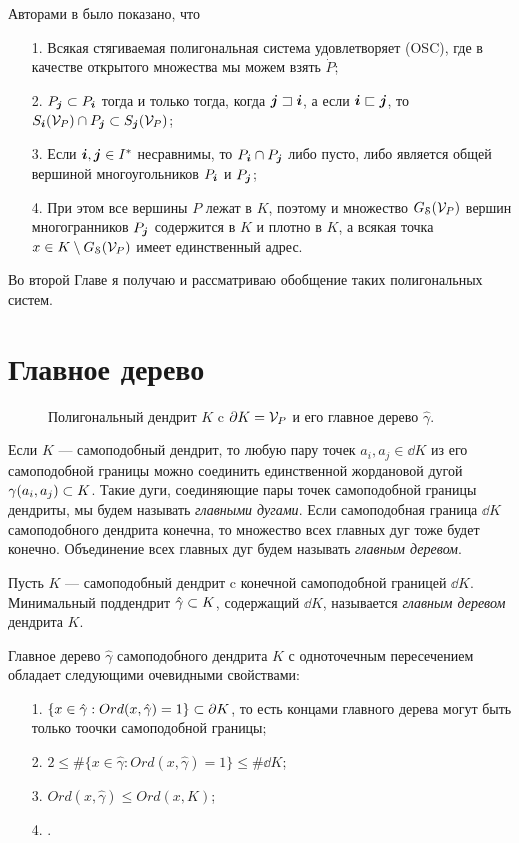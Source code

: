 Авторами в \cite[Theorem 4]{TSV2017} было показано, что
\begin{enumerate}[nolistsep]
\item[1.] Всякая стягиваемая полигональная система удовлетворяет (OSC), где  в качестве открытого множества мы можем взять $\dot P$;
\item[2.] $P_{\bm{j}}\subset P_{\bm{i}}$ тогда и только тогда, когда  ${\bm{j}}\sqsupset{\bm{i}}$, а если ${\bm{i}}\sqsubset{\bm{j}}$, то  $ S_{\bm{i}}({\mathcal V}_P)\cap P_{\bm{j}}\subset S_{\bm{j}}({\mathcal V}_P)$;
\item[3.] Если ${\bm{i}},{\bm{j}}\in I^*$ несравнимы, то $P_{\bm{i}}\cap P_{\bm{j}}$ либо пусто, либо является  общей вершиной многоугольников $P_{\bm{i}}$ и  $P_{\bm{j}}$;
\item[4.] При этом все вершины $P$ лежат в $K$, поэтому и множество $G_{\EuScript S}({\mathcal V}_P)$ вершин многогранников $P_{\bm{j}}$ содержится в $K$ и плотно в $K$, а всякая точка $x\in K\setminus G_{\EuScript S}({\mathcal V}_P)$ имеет единственный адрес.
\end{enumerate}
 
Во второй Главе я получаю и рассматриваю обобщение таких полигональных систем.



\section{Главное дерево}

\begin{figure}[H]
\caption{Полигональный дендрит $K$ c $\partial K={\mathcal V}_P$ и его главное дерево $\hat\gamma$. }
\label{fig:penta4plus3}
\end{figure}

Если $K$ --- самоподобный дендрит, то любую пару точек $a_i,a_j\in\dd K$ из его самоподобной границы можно соединить единственной жордановой дугой $\gamma(a_i,a_j)\subset K$.
Такие дуги, соединяющие пары точек самоподобной границы дендриты, мы будем называть {\em главными дугами}.
Если самоподобная граница $\dd K$ самоподобного дендрита конечна, то множество всех главных дуг тоже будет конечно.
Объединение всех главных дуг будем называть {\em главным деревом}.

\begin{definition}\label{dfn:MT}
Пусть $K$ --- самоподобный дендрит c конечной самоподобной границей $\dd K$. 
Минимальный поддендрит $\hat\gamma\subset K$, содержащий $\dd K$, называется {\em главным деревом} дендрита $K$.
\end{definition}

Главное дерево $\hat\gamma$ самоподобного дендрита $K$ с одноточечным пересечением обладает следующими очевидными свойствами:
\begin{enumerate}[nolistsep]
\item[1.] $\{x\in\hat\gamma:Ord(x,\hat\gamma)=1\}\subset\partial K$, то есть концами главного дерева могут быть только тоочки самоподобной границы;
\item[2.] $2\leq\#\{x\in\hat\gamma:Ord(x,\hat\gamma)=1\}\leq\#\dd K$;
\item[3.] $Ord(x,\hat\gamma)\leq Ord(x,K)$;
\item[4.] .
\end{enumerate}

